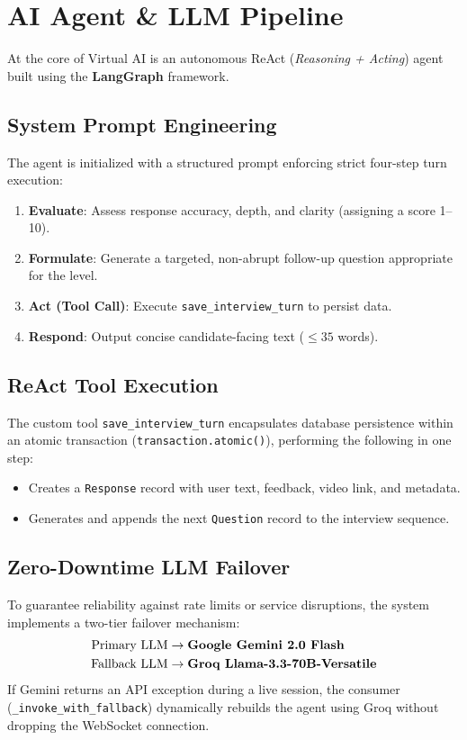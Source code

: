 \documentclass[twocolumn, 10pt, a4paper]{article}
\begin{document}
\section{AI Agent \& LLM Pipeline}
At the core of Virtual AI is an autonomous ReAct (\textit{Reasoning + Acting}) agent built using the \textbf{LangGraph} framework.

\subsection{System Prompt Engineering}
The agent is initialized with a structured prompt enforcing strict four-step turn execution:
\begin{enumerate}
    \item \textbf{Evaluate}: Assess response accuracy, depth, and clarity (assigning a score 1--10).
    \item \textbf{Formulate}: Generate a targeted, non-abrupt follow-up question appropriate for the level.
    \item \textbf{Act (Tool Call)}: Execute \texttt{save\_interview\_turn} to persist data.
    \item \textbf{Respond}: Output concise candidate-facing text ($\le 35$ words).
\end{enumerate}

\subsection{ReAct Tool Execution}
The custom tool \texttt{save\_interview\_turn} encapsulates database persistence within an atomic transaction (\texttt{transaction.atomic()}), performing the following in one step:
\begin{itemize}
    \item Creates a \texttt{Response} record with user text, feedback, video link, and metadata.
    \item Generates and appends the next \texttt{Question} record to the interview sequence.
\end{itemize}

\subsection{Zero-Downtime LLM Failover}
To guarantee reliability against rate limits or service disruptions, the system implements a two-tier failover mechanism:
\begin{align*}
\text{Primary LLM} &\rightarrow \text{\textbf{Google Gemini 2.0 Flash}} \\
\text{Fallback LLM} &\rightarrow \text{\textbf{Groq Llama-3.3-70B-Versatile}}
\end{align*}
If Gemini returns an API exception during a live session, the consumer (\texttt{\_invoke\_with\_fallback}) dynamically rebuilds the agent using Groq without dropping the WebSocket connection.
\end{document}
